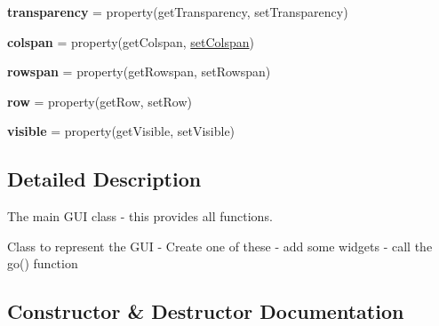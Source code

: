 \begin{DoxyCompactItemize}
\item 
\mbox{\label{classappjar_1_1gui_a1b62a097d08224a2c55e5aeb2c5f0ccc}} 
{\bfseries transparency} = property(get\+Transparency, set\+Transparency)
\item 
\mbox{\label{classappjar_1_1gui_a764991fdadc419d74e1ad3b45a52d53a}} 
{\bfseries colspan} = property(get\+Colspan, \hyperlink{classappjar_1_1gui_aaf0627ebbeda2d9bcb111c3aeab37f6e}{set\+Colspan})
\item 
\mbox{\label{classappjar_1_1gui_a7965f5905d7f03817bedc643b44c5d99}} 
{\bfseries rowspan} = property(get\+Rowspan, set\+Rowspan)
\item 
\mbox{\label{classappjar_1_1gui_ae4b919bd53e04a22e7e15e637ef8709e}} 
{\bfseries row} = property(get\+Row, set\+Row)
\item 
\mbox{\label{classappjar_1_1gui_af638898ac70c483c7f337e37c8b9e51e}} 
{\bfseries visible} = property(get\+Visible, set\+Visible)
\end{DoxyCompactItemize}


\subsection{Detailed Description}
The main G\+UI class -\/ this provides all functions. 

\begin{DoxyVerb}Class to represent the GUI
    - Create one of these
    - add some widgets
    - call the go() function \end{DoxyVerb}
 

\subsection{Constructor \& Destructor Documentation}
\mbox{\label{classappjar_1_1gui_aa3e4bc37b4a4d2a9a4c28b0c01f329df}} 
